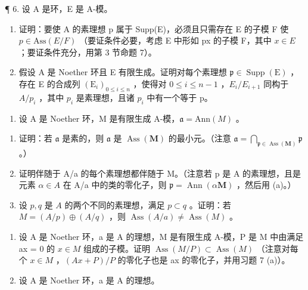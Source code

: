 ¶ 6. 设 A 是环，E 是 A-模。

\begin{enumerate}
\def\labelenumi{(\alph{enumi})}
\item
  证明：要使 A 的素理想 p 属于 Supp(E)，必须且只需存在 E 的子模 F 使 \(p \in \text{Ass}(E/F)\) （要证条件必要，考虑 E 中形如 px 的子模 F，其中 \(x \in E\) ；要证条件充分，用第 3 节命题 7）。
\item
  假设 A 是 Noether 环且 E 有限生成。证明对每个素理想 \(\mathfrak{p}\in\operatorname{Supp}(\mathrm{E})\) ，存在 E 的合成列 \((\mathrm{E}_{i})_{0\leqslant i\leqslant n}\) ，使得对 \(0\leqslant i\leqslant n-1\) ，\(E_{i}/E_{i+1}\) 同构于 \(A/p_{i}\) ，其中 \(p_{i}\) 是素理想，且诸 \(p_{i}\) 中有一个等于 p。
\end{enumerate}

\begin{enumerate}
\def\labelenumi{\arabic{enumi}.}
\setcounter{enumi}{6}
\tightlist
\item
  设 A 是 Noether 环，M 是有限生成 A-模，\(\mathfrak{a} = \text{Ann}(M)\) 。
\end{enumerate}

\begin{enumerate}
\def\labelenumi{(\alph{enumi})}
\item
  证明：若 \(\mathfrak{a}\) 是素的，则 \(\mathfrak{a}\) 是 \(\operatorname{Ass}(\mathbf{M})\) 的最小元。（注意 \(\mathfrak{a} = \bigcap_{\mathfrak{p} \in \operatorname{Ass}(\mathbf{M})} \mathfrak{p}\) 。）
\item
  证明伴随于 A/a 的每个素理想都伴随于 M。（注意若 p 是 A 的素理想，且是元素 \(\alpha \in A\) 在 A/a 中的类的零化子，则 \(\mathfrak{p} = \operatorname{Ann}(\alpha\mathbf{M})\) ，然后用 (a)。）
\item
  设 \(p, q\) 是 \(A\) 的两个不同的素理想，满足 \(p \subset q\) 。证明：若 \(M = (A/p) \oplus (A/q)\) ，则 \(\operatorname{Ass}(A/a) \neq \operatorname{Ass}(M)\) 。
\end{enumerate}

\begin{enumerate}
\def\labelenumi{\arabic{enumi}.}
\setcounter{enumi}{7}
\item
  设 A 是 Noether 环，a 是 A 的理想，M 是有限生成 A-模，P 是 M 中由满足 ax = 0 的 \(x \in M\) 组成的子模。证明 \(\operatorname{Ass}(M/P) \subset \operatorname{Ass}(M)\) （注意对每个 \(x \in M\) ，\((Ax + P)/P\) 的零化子也是 ax 的零化子，并用习题 7 (a)）。
\item
  设 A 是 Noether 环，a 是 A 的理想。
\end{enumerate}

